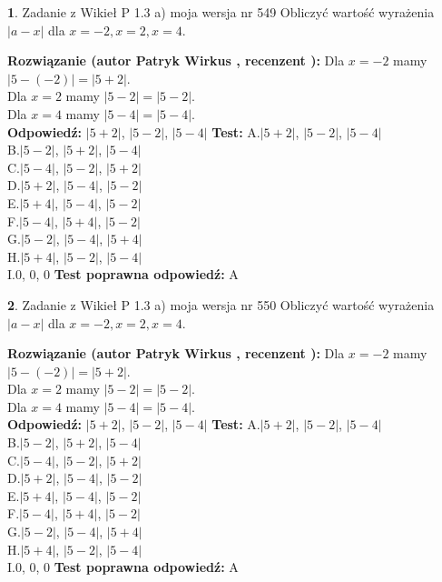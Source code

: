 \documentclass[12pt, a4paper]{article}
\theoremstyle{definition} %
\newtheorem{zad}{}
\newcommand{\zadStart}[1]{\begin{zad}#1\newline}
\newcommand{\zadStop}{\end{zad}}
\newcommand{\rozwStart}[2]{\noindent \textbf{Rozwiązanie (autor #1 , recenzent #2): }\newline}
\newcommand{\rozwStop}{\newline}
\newcommand{\odpStart}{\noindent \textbf{Odpowiedź:}\newline}
\newcommand{\odpStop}{\newline}
\newcommand{\testStart}{\noindent \textbf{Test:}\newline}
\newcommand{\testStop}{\newline}
\newcommand{\kluczStart}{\noindent \textbf{Test poprawna odpowiedź:}\newline}
\newcommand{\kluczStop}{\newline}
\begin{document}
\zadStart{Zadanie z Wikieł P 1.3 a) moja wersja nr 549}
Obliczyć wartość wyrażenia $|a - x|$ dla $x=-2,x=2,x=4$.
\zadStop
\rozwStart{Patryk Wirkus}{}
Dla $x = -2$ mamy $|5 - (-2)| = |5 + 2|$.\\
Dla $x = 2$ mamy $|5 - 2| = |5 - 2|$.\\
Dla $x = 4$ mamy $|5 - 4| = |5 - 4|$.\\
\rozwStop
\odpStart
$|5 + 2|$, $|5 - 2|$, $|5 - 4|$
\odpStop
\testStart
A.$|5 + 2|$, $|5 - 2|$, $|5 - 4|$\\
B.$|5 - 2|$, $|5 + 2|$, $|5 - 4|$\\
C.$|5 - 4|$, $|5 - 2|$, $|5 + 2|$\\
D.$|5 + 2|$, $|5 - 4|$, $|5 - 2|$\\
E.$|5 + 4|$, $|5 - 4|$, $|5 - 2|$\\
F.$|5 - 4|$, $|5 + 4|$, $|5 - 2|$\\
G.$|5 - 2|$, $|5 - 4|$, $|5 + 4|$\\
H.$|5 + 4|$, $|5 - 2|$, $|5 - 4|$\\
I.$0$, $0$, $0$
\testStop
\kluczStart
A
\kluczStop



\zadStart{Zadanie z Wikieł P 1.3 a) moja wersja nr 550}
Obliczyć wartość wyrażenia $|a - x|$ dla $x=-2,x=2,x=4$.
\zadStop
\rozwStart{Patryk Wirkus}{}
Dla $x = -2$ mamy $|5 - (-2)| = |5 + 2|$.\\
Dla $x = 2$ mamy $|5 - 2| = |5 - 2|$.\\
Dla $x = 4$ mamy $|5 - 4| = |5 - 4|$.\\
\rozwStop
\odpStart
$|5 + 2|$, $|5 - 2|$, $|5 - 4|$
\odpStop
\testStart
A.$|5 + 2|$, $|5 - 2|$, $|5 - 4|$\\
B.$|5 - 2|$, $|5 + 2|$, $|5 - 4|$\\
C.$|5 - 4|$, $|5 - 2|$, $|5 + 2|$\\
D.$|5 + 2|$, $|5 - 4|$, $|5 - 2|$\\
E.$|5 + 4|$, $|5 - 4|$, $|5 - 2|$\\
F.$|5 - 4|$, $|5 + 4|$, $|5 - 2|$\\
G.$|5 - 2|$, $|5 - 4|$, $|5 + 4|$\\
H.$|5 + 4|$, $|5 - 2|$, $|5 - 4|$\\
I.$0$, $0$, $0$
\testStop
\kluczStart
A
\kluczStop
\end{document}
